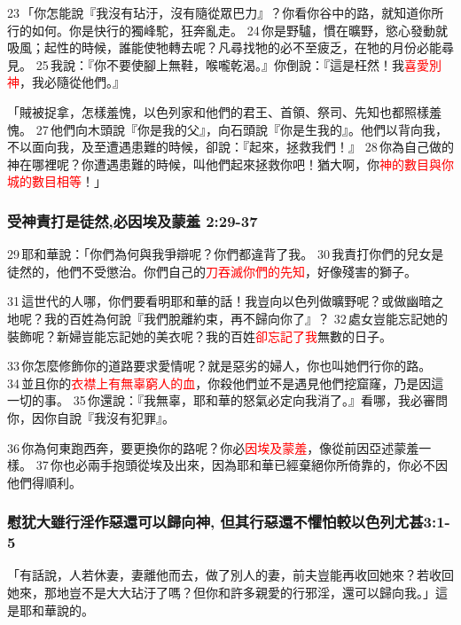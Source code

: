 23 「你怎能說『我沒有玷汙，沒有隨從眾巴力』？你看你谷中的路，就知道你所行的如何。你是快行的獨峰駝，狂奔亂走。 24 你是野驢，慣在曠野，慾心發動就吸風；起性的時候，誰能使牠轉去呢？凡尋找牠的必不至疲乏，在牠的月份必能尋見。 25 我說：『你不要使腳上無鞋，喉嚨乾渴。』你倒說：『這是枉然！我\textcolor{red}{喜愛別神}，我必隨從他們。』

「賊被捉拿，怎樣羞愧，以色列家和他們的君王、首領、祭司、先知也都照樣羞愧。 27 他們向木頭說『你是我的父』，向石頭說『你是生我的』。他們以背向我，不以面向我，及至遭遇患難的時候，卻說：『起來，拯救我們！』 28 你為自己做的神在哪裡呢？你遭遇患難的時候，叫他們起來拯救你吧！猶大啊，你\textcolor{red}{神的數目與你城的數目相等}！」

\subsubsection{受神責打是徒然,必因埃及蒙羞 2:29-37}
29 耶和華說：「你們為何與我爭辯呢？你們都違背了我。 30 我責打你們的兒女是徒然的，他們不受懲治。你們自己的\textcolor{red}{刀吞滅你們的先知}，好像殘害的獅子。 


31 這世代的人哪，你們要看明耶和華的話！我豈向以色列做曠野呢？或做幽暗之地呢？我的百姓為何說『我們脫離約束，再不歸向你了』？ 32 處女豈能忘記她的裝飾呢？新婦豈能忘記她的美衣呢？我的百姓\textcolor{red}{卻忘記了我}無數的日子。 

33 你怎麼修飾你的道路要求愛情呢？就是惡劣的婦人，你也叫她們行你的路。 34 並且你的\textcolor{red}{衣襟上有無辜窮人的血}，你殺他們並不是遇見他們挖窟窿，乃是因這一切的事。 35 你還說：『我無辜，耶和華的怒氣必定向我消了。』看哪，我必審問你，因你自說『我沒有犯罪』。 

36 你為何東跑西奔，要更換你的路呢？你必\textcolor{red}{因埃及蒙羞}，像從前因亞述蒙羞一樣。 37 你也必兩手抱頭從埃及出來，因為耶和華已經棄絕你所倚靠的，你必不因他們得順利。

\subsubsection{慰犹大雖行淫作惡還可以歸向神, 但其行惡還不懼怕較以色列尤甚3:1-5}
「有話說，人若休妻，妻離他而去，做了別人的妻，前夫豈能再收回她來？若收回她來，那地豈不是大大玷汙了嗎？但你和許多親愛的行邪淫，還可以歸向我。」這是耶和華說的。


